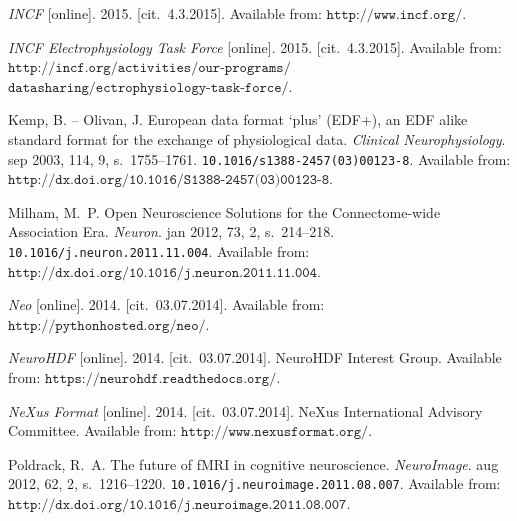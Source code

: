 \documentclass[conference]{IEEEtran}
\begin{document}
\begin{thebibliography}{1}
\emph{INCF} [online]. 2015. [cit.~4.3.2015].
\newblock Available from: $\texttt{{http://www.incf.org/}}$.

\emph{INCF Electrophysiology Task Force} [online]. 2015. [cit.~4.3.2015].
\newblock Available from: $\texttt{{http://incf.org/activities/our-programs/}}$
$\texttt{{datasharing/ectrophysiology-task-force/}}$.




{\sc Kemp}, B. -- {\sc Olivan}, J.
\newblock European data format `plus' (EDF+), an {EDF} alike standard format
for the exchange of physiological data.
\newblock \emph{Clinical Neurophysiology}. sep 2003, 114, 9, s.~1755--1761.
\newblock \texttt{10.1016/s1388-2457(03)00123-8}.
\newblock Available from:
$\texttt{{http://dx.doi.org/10.1016/S1388-2457(03)00123-8}}$.




{\sc Milham}, M.~P.
\newblock Open Neuroscience Solutions for the Connectome-wide Association Era.
\newblock \emph{Neuron}. jan 2012, 73, 2, s.~214--218.
\newblock \texttt{10.1016/j.neuron.2011.11.004}.
\newblock Available from:
$\texttt{{http://dx.doi.org/10.1016/j.neuron.2011.11.004}}$.

\emph{Neo} [online]. 2014. [cit.~03.07.2014].
\newblock Available from: $\texttt{{http://pythonhosted.org/neo/}}$.

\emph{NeuroHDF} [online]. 2014. [cit.~03.07.2014]. NeuroHDF Interest Group.
\newblock Available from: $\texttt{{https://neurohdf.readthedocs.org/}}$.

\emph{NeXus Format} [online]. 2014. [cit.~03.07.2014]. NeXus International
Advisory Committee.
\newblock Available from: $\texttt{{http://www.nexusformat.org/}}$.




{\sc Poldrack}, R.~A.
\newblock The future of {fMRI} in cognitive neuroscience.
\newblock \emph{{NeuroImage}}. aug 2012, 62, 2, s.~1216--1220.
\newblock \texttt{10.1016/j.neuroimage.2011.08.007}.
\newblock Available from:
$\texttt{{http://dx.doi.org/10.1016/j.neuroimage.2011.08.007}}$.




\end{thebibliography}
\end{document}
